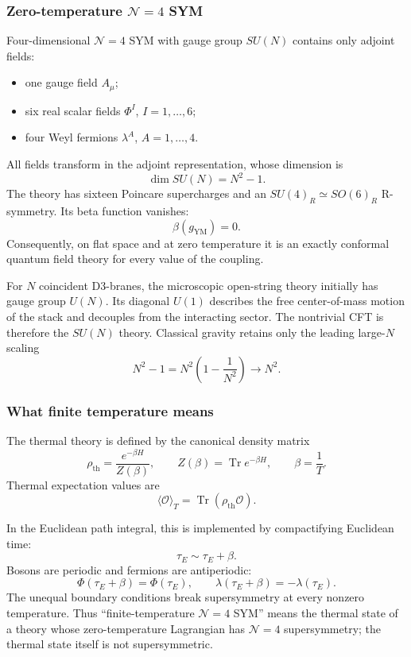 \documentclass[
  10pt,
  a4paper,
  openany]{book}
\providecommand{\tightlist}{%
  \setlength{\itemsep}{0pt}\setlength{\parskip}{0pt}}
\begin{document}
\subsubsection{\texorpdfstring{Zero-temperature \(\mathcal N=4\)
SYM}{Zero-temperature \textbackslash mathcal N=4 SYM}}\label{zero-temperature-mathcal-n4-sym}

Four-dimensional \(\mathcal N=4\) SYM with gauge group \(SU(N)\)
contains only adjoint fields:

\begin{itemize}
\tightlist
\item
  one gauge field \(A_\mu\);
\item
  six real scalar fields \(\Phi^I\), \(I=1,\ldots,6\);
\item
  four Weyl fermions \(\lambda^A\), \(A=1,\ldots,4\).
\end{itemize}

All fields transform in the adjoint representation, whose dimension is
\[
\dim SU(N)=N^2-1.
\] The theory has sixteen Poincare supercharges and an
\(SU(4)_R\simeq SO(6)_R\) R-symmetry. Its beta function vanishes: \[
\beta(g_{\mathrm{YM}})=0.
\] Consequently, on flat space and at zero temperature it is an exactly
conformal quantum field theory for every value of the coupling.

For \(N\) coincident D3-branes, the microscopic open-string theory
initially has gauge group \(U(N)\). Its diagonal \(U(1)\) describes the
free center-of-mass motion of the stack and decouples from the
interacting sector. The nontrivial CFT is therefore the \(SU(N)\)
theory. Classical gravity retains only the leading large-\(N\) scaling
\[
N^2-1=N^2\left(1-\frac1{N^2}\right)
\longrightarrow N^2.
\]

\subsubsection{What finite temperature
means}\label{what-finite-temperature-means}

The thermal theory is defined by the canonical density matrix \[
\rho_{\mathrm{th}}
=\frac{e^{-\beta H}}{Z(\beta)},
\qquad
Z(\beta)
=\operatorname{Tr}e^{-\beta H},
\qquad
\beta=\frac1T.
\] Thermal expectation values are \[
\langle\mathcal O\rangle_T
=
\operatorname{Tr}
\left(
\rho_{\mathrm{th}}\mathcal O
\right).
\]

In the Euclidean path integral, this is implemented by compactifying
Euclidean time: \[
\tau_E\sim\tau_E+\beta.
\] Bosons are periodic and fermions are antiperiodic: \[
\Phi(\tau_E+\beta)=\Phi(\tau_E),
\qquad
\lambda(\tau_E+\beta)=-\lambda(\tau_E).
\] The unequal boundary conditions break supersymmetry at every nonzero
temperature. Thus ``finite-temperature \(\mathcal N=4\) SYM'' means the
thermal state of a theory whose zero-temperature Lagrangian has
\(\mathcal N=4\) supersymmetry; the thermal state itself is not
supersymmetric.
\end{document}
